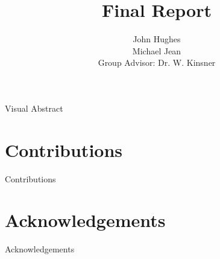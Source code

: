 \documentclass[english]{scrreprt}
\begin{document}


\subject{Design and implementation of a distributed automotive sensor/actuator network}
\title{Final Report}

\author{John Hughes\\ Michael Jean\\ Group Advisor: Dr. W. Kinsner}

\maketitle

\newpage
{}
 \label{visual_abstract}
Visual Abstract

\begin{abstract}

\end{abstract}

\chapter*{Contributions}
Contributions

\chapter*{Acknowledgements}
Acknowledgements

\renewcommand{\contentsname}{Table of Contents}
\tableofcontents{}

\newpage
{}
 \label{listoffig}
\listoffigures

\newpage
{}
 \label{listoftab}
\listoftables

\newpage
{}
 \label{nomenclature}
\printnomenclature{}

\newpage











\end{document}
